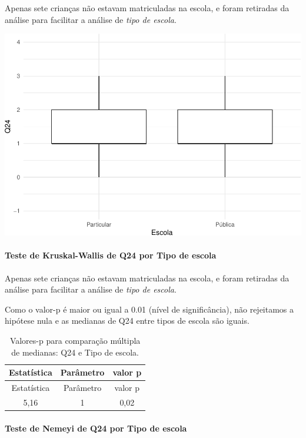 \documentclass[]{article}
\let\oldparagraph\paragraph
\renewcommand{\paragraph}[1]{\oldparagraph{#1}\mbox{}}
\begin{document}
Apenas sete crianças não estavam matriculadas na escola, e foram retiradas da análise para facilitar a análise de \emph{tipo de escola}.

\begin{center}\includegraphics[width=0.75\linewidth]{relatorio_covid19_files/figure-latex/unnamed-chunk-648-1} \end{center}

\hypertarget{teste-de-kruskal-wallis-de-q24-por-tipo-de-escola}{%
\paragraph{Teste de Kruskal-Wallis de Q24 por Tipo de escola}\label{teste-de-kruskal-wallis-de-q24-por-tipo-de-escola}}

Apenas sete crianças não estavam matriculadas na escola, e foram retiradas da análise para facilitar a análise de \emph{tipo de escola}.

Como o valor-p é maior ou igual a 0.01 (nível de significância), não rejeitamos a hipótese nula e as medianas de Q24 entre tipos de escola são iguais.

\begin{longtable}[]{@{}ccc@{}}
\caption{\label{tab:unnamed-chunk-650}Valores-p para comparação múltipla de medianas: Q24 e Tipo de escola.}\tabularnewline
\toprule
Estatística & Parâmetro & valor p\tabularnewline
\midrule
\endfirsthead
\toprule
Estatística & Parâmetro & valor p\tabularnewline
\midrule
\endhead
5,16 & 1 & 0,02\tabularnewline
\bottomrule
\end{longtable}

\hypertarget{teste-de-nemeyi-de-q24-por-tipo-de-escola}{%
\paragraph{Teste de Nemeyi de Q24 por Tipo de escola}\label{teste-de-nemeyi-de-q24-por-tipo-de-escola}}
\end{document}
